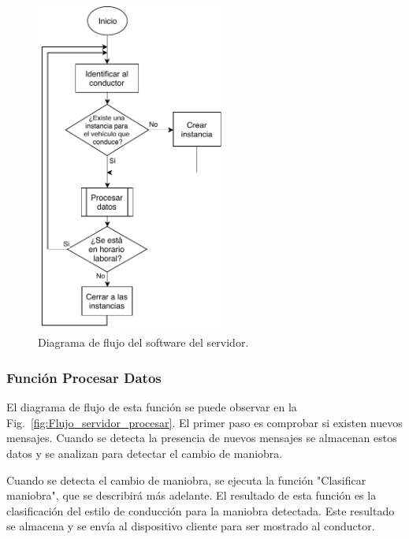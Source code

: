 \begin{figure}[bth!]
\centering
\includegraphics[width=0.55\textwidth]{Flujo_servidor_principal.pdf}
\caption{Diagrama de flujo del software del servidor.}
\label{fig:Flujo_servidor_principal}
\end{figure}

\subsubsection{Función Procesar Datos}
El diagrama de flujo de esta función se puede observar en la Fig.~\ref{fig:Flujo_servidor_procesar}. El primer paso es comprobar si existen nuevos mensajes. Cuando se detecta la presencia de nuevos mensajes se almacenan estos datos y se analizan para detectar el cambio de maniobra.

Cuando se detecta el cambio de maniobra, se ejecuta la función "Clasificar maniobra", que se describirá más adelante. El resultado de esta función es la clasificación del estilo de conducción para la maniobra detectada. Este resultado se almacena y se envía al dispositivo cliente para ser mostrado al conductor.

